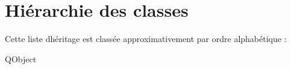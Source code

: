 \section{Hiérarchie des classes}
Cette liste d\textquotesingle{}héritage est classée approximativement par ordre alphabétique \+:\begin{DoxyCompactList}
\item Q\+Object\begin{DoxyCompactList}
\item {}
\end{DoxyCompactList}
\end{DoxyCompactList}
